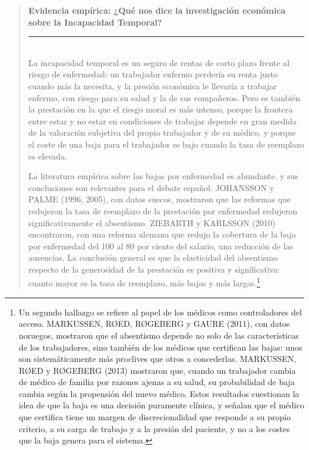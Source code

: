 \documentclass[10pt,a4paper]{article}
\newenvironment{specialblock}[1]{%
      \begin{quote} %
      \small %
      \noindent\textbf{#1}\\[-0.3em] %
      \rule{\linewidth}{0.4pt}\\[0.6em]}{
      \end{quote}}
\begin{document}
\begin{specialblock}{\textbf{Evidencia empírica:} ¿Qué nos dice la investigación económica sobre la Incapacidad Temporal?}
    La incapacidad temporal es un seguro de rentas de corto plazo frente al riesgo de enfermedad: un trabajador enfermo perdería su renta justo cuando más la necesita, y la presión económica le llevaría a trabajar enfermo, con riesgo para su salud y la de sus compañeros. Pero es también la prestación en la que el riesgo moral es más intenso, porque la frontera entre estar y no estar en condiciones de trabajar depende en gran medida de la valoración subjetiva del propio trabajador y de su médico, y porque el coste de una baja para el trabajador es bajo cuando la tasa de reemplazo es elevada.
    
    La literatura empírica sobre las bajas por enfermedad es abundante, y sus conclusiones son relevantes para el debate español. JOHANSSON y PALME (1996, 2005), con datos suecos, mostraron que las reformas que redujeron la tasa de reemplazo de la prestación por enfermedad redujeron significativamente el absentismo. ZIEBARTH y KARLSSON (2010) encontraron, con una reforma alemana que redujo la cobertura de la baja por enfermedad del 100 al 80 por ciento del salario, una reducción de las ausencias. La conclusión general es que la elasticidad del absentismo respecto de la generosidad de la prestación es positiva y significativa: cuanto mayor es la tasa de reemplazo, más bajas y más largas.\footnote{%
        Un segundo hallazgo se refiere al papel de los médicos como controladores del acceso. MARKUSSEN, RØED, RØGEBERG y GAURE (2011), con datos noruegos, mostraron que el absentismo depende no solo de las características de los trabajadores, sino también de los médicos que certifican las bajas: unos son sistemáticamente más proclives que otros a concederlas. MARKUSSEN, RØED y RØGEBERG (2013) mostraron que, cuando un trabajador cambia de médico de familia por razones ajenas a su salud, su probabilidad de baja cambia según la propensión del nuevo médico. Estos resultados cuestionan la idea de que la baja es una decisión puramente clínica, y señalan que el médico que certifica tiene un margen de discrecionalidad que responde a su propio criterio, a su carga de trabajo y a la presión del paciente, y no a los costes que la baja genera para el sistema.
}
\end{specialblock}
\end{document}
